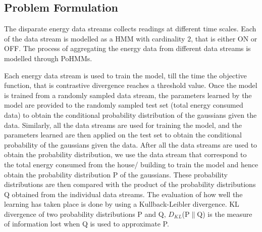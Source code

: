 \documentclass[conference]{IEEEtran}
\begin{document}
\subsection{Problem Formulation}
The disparate energy data streams collects readings at different time scales. Each of the data stream is modelled as a HMM with cardinality $2$, that is either ON or OFF. The process of aggregating the energy data from different data streams is modelled through PoHMMs. 

Each energy data stream is used to train the model, till the time the objective function, that is contrastive divergence reaches a threshold value. Once the model is trained from a randomly sampled data stream, the parameters learned by the model %
are provided to the randomly sampled test set (total energy consumed data) to obtain the conditional probability distribution of the gaussians given the data. Similarly, all the data streams are used for training the model, and the parameters learned are then applied on the test set to obtain the conditional probability of the gaussians given the data. After all the data streams are used to obtain the probability distribution, we use the data stream that correspond to the total energy consumed from the house/ building to train the model and hence obtain the probability distribution P of the gaussians. These probability distributions are then compared with the product of the probability distributions Q obtained from the individual data streams. The evaluation of how well the learning has taken place is done by using a Kullback-Leibler divergence. KL divergence of two probability distributions P and Q, $D_{KL}$(P$\parallel$Q) is the measure of information lost when Q is used to approximate P. %
\end{document}
